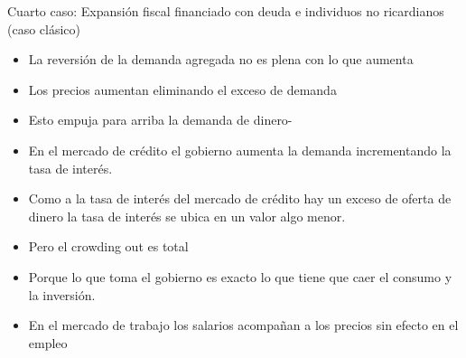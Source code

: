\documentclass{beamer}
\begin{document}
\begin{frame}{Cuarto caso: Expansión fiscal financiado con deuda e individuos no ricardianos (caso clásico)}
   
   \begin{itemize}
       \item La reversión de la demanda agregada no es plena con lo que aumenta 
       \item Los precios aumentan eliminando el exceso de demanda
       \item Esto empuja para arriba la demanda de dinero-
        \item En el mercado de crédito el gobierno aumenta la demanda incrementando la tasa de interés. 
         \item Como a la tasa de interés del mercado de crédito hay un exceso de oferta de dinero la tasa de interés se ubica en un valor algo menor. 
        \item Pero el crowding out es total
        \item Porque lo que toma el gobierno es exacto lo que tiene que caer el consumo y la inversión. 
         \item En el mercado de trabajo los salarios acompañan a los precios sin efecto en el empleo 
   \end{itemize}
    
\end{frame}
\end{document}
